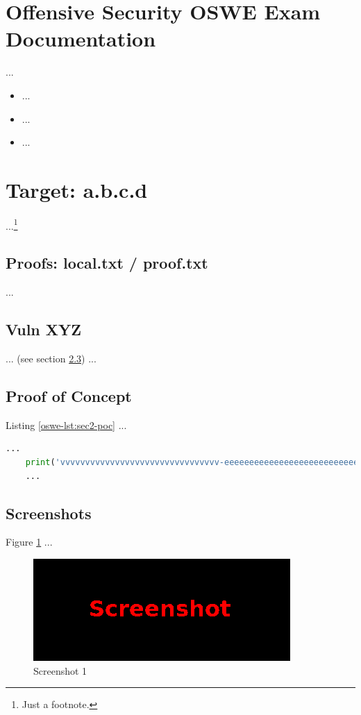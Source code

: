 %
%
%
\section{Offensive Security OSWE Exam Documentation}\label{oswe-sec:sec1}
%
...

\begin{itemize}
    \item ...
    \item ...
    \item ...
\end{itemize}
%
%
%
\section{Target: a.b.c.d}\label{oswe-sec:sec2}
%
...\footnote{Just a footnote.}
%
%
%
\subsection{Proofs: local.txt / proof.txt}\label{oswe-sec:sec2-proofs}
%
...
%
%
%
\subsection{Vuln XYZ}\label{oswe-sec:sec2-vuln}
%
... (see section \ref{oswe-sec:sec2-poc}) ...

%
%
%
\subsection{Proof of Concept}\label{oswe-sec:sec2-poc}
%
Listing \ref{oswe-lst:sec2-poc} ...\\

\begin{lstlisting}[language=Python,caption={Proof of Concept}, label={oswe-lst:sec2-poc}]
    ...
    print('vvvvvvvvvvvvvvvvvvvvvvvvvvvvvvvv-eeeeeeeeeeeeeeeeeeeeeeeeeeeeeeeeeeeeeeeeeee-looooooooooooooooooooooong-striiiiiiiiiiiiiing')
    ...
\end{lstlisting}
%
%
%
\subsection{Screenshots}\label{oswe-sec:sec2-screens}
%
Figure \ref{oswe-fig:sec2-screen1} ...

\begin{figure}[H]
    \centering
    \includegraphics[width=\textwidth]{img/assignment1/screen1.png}
    \caption{Screenshot 1}\label{oswe-fig:sec2-screen1}
\end{figure}
%
%
%
